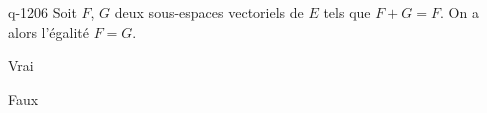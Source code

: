 \begin{truefalse}{q-1206}
Soit $F$, $G$ deux sous-espaces vectoriels de $E$ tels que $F+G=F$. On a alors l'égalité $F=G$.
\item Vrai
\item* Faux
\end{truefalse}

